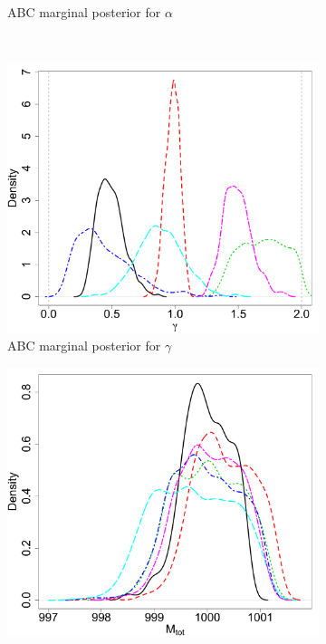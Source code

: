 \documentclass[12pt]{article}
\begin{document}
\begin{figure}[htbp]
\begin{subfigure}{0.48\textwidth}
\caption{ABC marginal posterior for  $\alpha$}\label{subfig:marg_alpha} 
\end{subfigure} \\
\begin{subfigure}{0.48\textwidth}
\centering
\includegraphics[width = \textwidth]{figures/marg_gamma.pdf} 
\caption{ABC marginal posterior for $\gamma$}\label{subfig:marg_gamma}
\end{subfigure}
\begin{subfigure}{0.48\textwidth}
\centering
\includegraphics[width = \textwidth]{figures/marg_mtot.pdf} 

\end{subfigure}
\end{figure}
\end{document}

